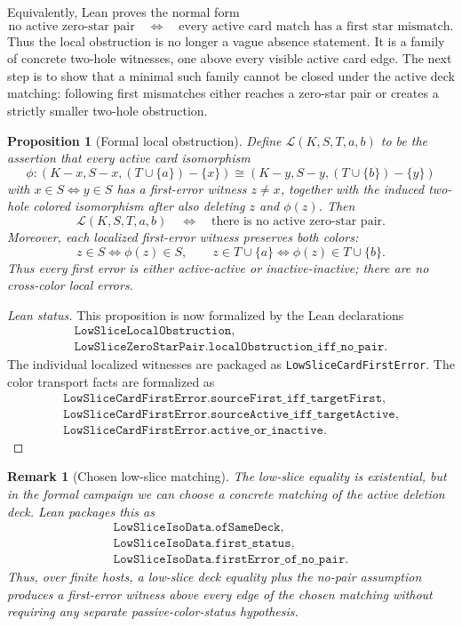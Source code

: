 \documentclass[11pt]{article}
\newtheorem{proposition}{Proposition}
\newtheorem{remark}{Remark}
\begin{document}
Equivalently, Lean proves the normal form
\[
  \text{no active zero-star pair}
  \quad\Longleftrightarrow\quad
  \text{every active card match has a first star mismatch}.
\]
Thus the local obstruction is no longer a vague absence statement.  It is a
family of concrete two-hole witnesses, one above every visible active card
edge.  The next step is to show that a minimal such family cannot be closed
under the active deck matching: following first mismatches either reaches a
zero-star pair or creates a strictly smaller two-hole obstruction.

\begin{proposition}[Formal local obstruction]
Define \(\mathcal L(K,S,T,a,b)\) to be the assertion that every active card
isomorphism
\[
  \phi:(K-x,S-x,(T\cup\{a\})-\{x\})
  \cong
  (K-y,S-y,(T\cup\{b\})-\{y\})
\]
with \(x\in S\iff y\in S\) has a first-error witness \(z\neq x\), together
with the induced two-hole colored isomorphism after also deleting \(z\) and
\(\phi(z)\).  Then
\[
  \mathcal L(K,S,T,a,b)
  \quad\Longleftrightarrow\quad
  \text{there is no active zero-star pair}.
\]
Moreover, each localized first-error witness preserves both colors:
\[
  z\in S\iff \phi(z)\in S,\qquad
  z\in T\cup\{a\}\iff \phi(z)\in T\cup\{b\}.
\]
Thus every first error is either active-active or inactive-inactive; there are
no cross-color local errors.
\end{proposition}

\begin{proof}[Lean status]
This proposition is now formalized by the Lean declarations
\[
\begin{array}{l}
\texttt{LowSliceLocalObstruction},\\
\texttt{LowSliceZeroStarPair.localObstruction\_iff\_no\_pair}.
\end{array}
\]
The individual localized witnesses are packaged as
\texttt{LowSliceCardFirstError}.  The color transport facts are formalized as
\[
\begin{array}{l}
\texttt{LowSliceCardFirstError.sourceFirst\_iff\_targetFirst},\\
\texttt{LowSliceCardFirstError.sourceActive\_iff\_targetActive},\\
\texttt{LowSliceCardFirstError.active\_or\_inactive}.
\end{array}
\]
\end{proof}

\begin{remark}[Chosen low-slice matching]
The low-slice equality is existential, but in the formal campaign we can choose
a concrete matching of the active deletion deck.  Lean packages this as
\[
\begin{array}{l}
\texttt{LowSliceIsoData.ofSameDeck},\\
\texttt{LowSliceIsoData.first\_status},\\
\texttt{LowSliceIsoData.firstError\_of\_no\_pair}.
\end{array}
\]
Thus, over finite hosts, a low-slice deck equality plus the no-pair assumption
produces a first-error witness above every edge of the chosen matching without
requiring any separate passive-color-status hypothesis.
\end{remark}
\end{document}
